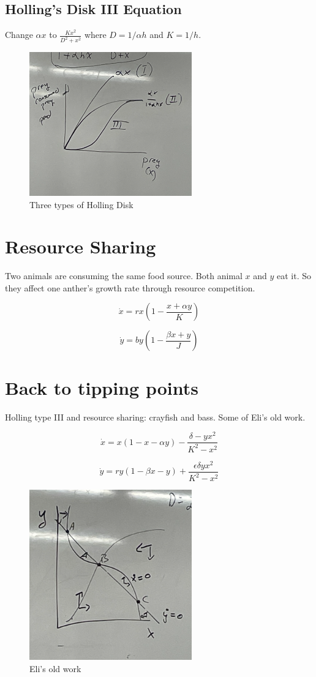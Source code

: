 \documentclass{article}
\begin{document}
\subsection{Holling's Disk III Equation}
Change $\alpha x$ to $\frac{K x^2}{D^2 + x^2}$ where $D = 1 / \alpha h$ and $K = 1/h$. 
\begin{figure}[htp]
    \centering
    \includegraphics[width=7cm]{holling-disk.png}
    \caption{Three types of Holling Disk}
\end{figure}

\section{Resource Sharing}
Two animals are consuming the same food source. Both animal $x$ and $y$ eat it. So they affect one anther's growth rate through resource competition. 

$$ \dot x = rx(1 - \frac{x + \alpha y}{K})$$

$$ \dot y = b y ( 1 - \frac{\beta x + y}{J})$$

\section{Back to tipping points}
Holling type III and resource sharing: crayfish and bass. Some of Eli's old work.

$$ \dot x = x(1 - x - \alpha y) - \frac{\delta - y x^2}{K^2 - x^2}$$

$$\dot y = ry(1 - \beta x - y) + \frac{\epsilon \delta y x^2}{K^2 - x^2}$$

\begin{figure}[htp]
    \centering
    \includegraphics[width=7cm]{bass-crayfish.png}
    \caption{Eli's old work}
\end{figure}
\end{document}
